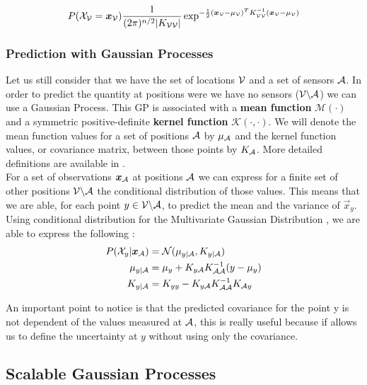 \documentclass[12pt,twoside]{report}
\begin{document}
\begin{equation}
	P(\mathcal{X}_{\mathcal{V}} = {\boldsymbol{{x}}}_{\mathcal{V}}) \frac{1}{(2\pi)^{n/2} |K_{\mathcal{V}\mathcal{V}}|} \exp^{-\frac{1}{2}({\boldsymbol{{x}}}_{\mathcal{V}} - \mu_{\mathcal{V}})^T K_{\mathcal{V}\mathcal{V}}^{-1} ({\boldsymbol{{x}}}_{\mathcal{V}} - \mu_{\mathcal{V}})}
\end{equation}


\subsubsection{Prediction with Gaussian Processes}
Let us still consider that we have the set of locations $\mathcal{V}$ and a set of sensors $\mathcal{A}$. In order to predict the quantity at positions were we have no sensors ($\mathcal{V} \backslash \mathcal{A} $) we can use a Gaussian Process. This GP is associated with a \textbf{mean function} $\mathcal{M}(\cdot)$ and a symmetric positive-definite \textbf{kernel function} $\mathcal{K}(\cdot,\cdot)$. We will denote the mean function values for a set of positions $\mathcal{A}$ by $\mu_{\mathcal{A}}$ and the kernel function values, or covariance matrix, between those points by $K_{\mathcal{A}}$. More detailed definitions are available in \citet[p.~13-16]{rasmussen_gaussian_2006}. \\

For a set of observations ${\boldsymbol{{x}}}_{\mathcal{A}}$ at positions $\mathcal{A}$ we can express for a finite set of other positions $\mathcal{V} \backslash \mathcal{A} $ the conditional distribution of those values. This means that we are able, for each point $y \in \mathcal{V} \backslash \mathcal{A} $, to predict the mean and the variance of $\vec{x}_y$. Using conditional distribution for the Multivariate Gaussian Distribution \citep[p.~193]{deisenroth_mathematics_2018}, we are able to express the following : 
\begin{align}
	P(\mathcal{X}_y | {\boldsymbol{{x}}}_{\mathcal{A}} ) &= \mathcal{N}(\mu_{y | \mathcal{A}}, K_{y | \mathcal{A}}) \\
	\mu_{y | \mathcal{A}} &= \mu_y + K_{y\mathcal{A}} K_{\mathcal{A}\mathcal{A}}^{-1} (y - \mu_y)\\ 
	K_{y | \mathcal{A}} &=  K_{yy} - K_{y\mathcal{A}} K_{\mathcal{A}\mathcal{A}}^{-1} K_{\mathcal{A} y} \label{equ:covGP}
\end{align}

An important point to notice is that the predicted covariance for the point y is not dependent of the values measured at $\mathcal{A}$, this is really useful because if allows us to define the uncertainty at $y$ without using only the covariance. \\

\subsection{Scalable Gaussian Processes} 
\end{document}
